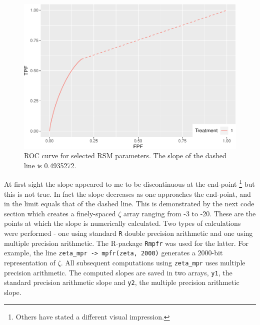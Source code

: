 \documentclass[
]{book}
\begin{document}
\begin{figure}
\centering
\includegraphics{17a-rsm-predictions_files/figure-latex/rsm-pred-roc-plot-1.pdf}
\caption{\label{fig:rsm-pred-roc-plot}ROC curve for selected RSM parameters. The slope of the dashed line is 0.4935272.}
\end{figure}

At first sight the slope appeared to me to be discontinuous at the end-point \footnote{Others have stated a different visual impression.} but this is not true. In fact the slope decreases as one approaches the end-point, and in the limit equals that of the dashed line. This is demonstrated by the next code section which creates a finely-spaced \(\zeta\) array ranging from -3 to -20. These are the points at which the slope is numerically calculated. Two types of calculations were performed - one using standard \texttt{R} double precision arithmetic and one using multiple precision arithmetic. The R-package \texttt{Rmpfr} was used for the latter. For example, the line \texttt{zeta\_mpr\ -\textgreater{}\ mpfr(zeta,\ 2000)} generates a 2000-bit representation of \(\zeta\). All subsequent computations using \texttt{zeta\_mpr} uses multiple precision arithmetic. The computed slopes are saved in two arrays, \texttt{y1}, the standard precision arithmetic slope and \texttt{y2}, the multiple precision arithmetic slope.
\end{document}
